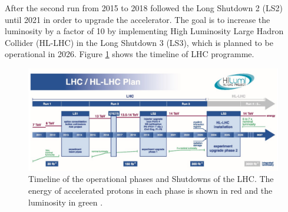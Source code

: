After the second run from 2015 to 2018 followed the Long Shutdown 2 (LS2) until 2021 in order to upgrade the accelerator. The goal is to increase the luminosity by a factor of 10 by
implementing High Luminosity Large Hadron Collider (HL-LHC) in the Long Shutdown 3 (LS3), which is planned to be operational in 2026. Figure \ref{fig:lhc_plan} shows the timeline
of LHC programme.

\begin{figure}
  \centering
  \includegraphics[height=0.4\textwidth]{images/lhc_plan.png}
  \caption{Timeline of the operational phases and Shutdowns of the LHC. The energy of accelerated protons in each phase is shown in red and the luminosity in green \cite{lhc_plan}.}
  \label{fig:lhc_plan}
\end{figure}

